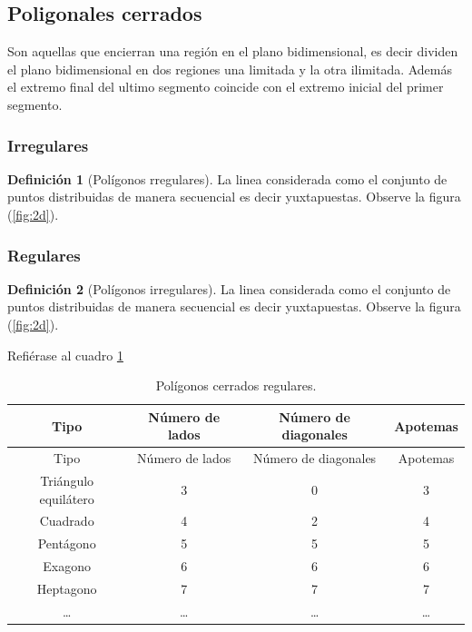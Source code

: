 \documentclass[16pt,]{krantz}
\theoremstyle{definition}
\newtheorem{definition}{Definición}[chapter]
\theoremstyle{definition}
\theoremstyle{definition}
\theoremstyle{definition}
\theoremstyle{remark}
\begin{document}
\hypertarget{poligonales-cerrados}{%
\subsection{Poligonales cerrados}\label{poligonales-cerrados}}

Son aquellas que encierran una región en el plano bidimensional, es decir dividen el plano bidimensional en dos regiones una limitada y la otra ilimitada. Además el extremo final del ultimo segmento coincide con el extremo inicial del primer segmento.

\hypertarget{irregulares}{%
\subsubsection{Irregulares}\label{irregulares}}

\begin{definition}[Polígonos rregulares]
\protect\hypertarget{def:irregulares}{}{\label{def:irregulares} {} }La linea considerada como el conjunto de puntos distribuidas de manera secuencial es decir yuxtapuestas. Observe la figura (\ref{fig:2d}).
\end{definition}

\hypertarget{regulares}{%
\subsubsection{Regulares}\label{regulares}}

\begin{definition}[Polígonos irregulares]
\protect\hypertarget{def:regulares}{}{\label{def:regulares} {} }La linea considerada como el conjunto de puntos distribuidas de manera secuencial es decir yuxtapuestas. Observe la figura (\ref{fig:2d}).
\end{definition}

Refiérase al cuadro \ref{tab:regulares}

\begin{longtable}[]{@{}cccc@{}}
\caption{\label{tab:regulares} Polígonos cerrados regulares.}\tabularnewline
\toprule
Tipo & Número de lados & Número de diagonales & Apotemas\tabularnewline
\midrule
\endfirsthead
\toprule
Tipo & Número de lados & Número de diagonales & Apotemas\tabularnewline
\midrule
\endhead
Triángulo equilátero & 3 & 0 & 3\tabularnewline
Cuadrado & 4 & 2 & 4\tabularnewline
Pentágono & 5 & 5 & 5\tabularnewline
Exagono & 6 & 6 & 6\tabularnewline
Heptagono & 7 & 7 & 7\tabularnewline
\ldots{} & \ldots{} & \ldots{} & \ldots{}\tabularnewline
\bottomrule
\end{longtable}
\end{document}
